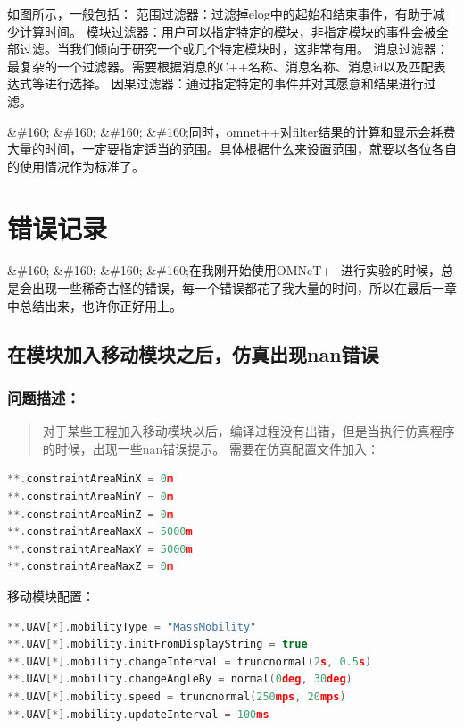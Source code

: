 如图所示，一般包括：
范围过滤器：过滤掉elog中的起始和结束事件，有助于减少计算时间。
模块过滤器：用户可以指定特定的模块，非指定模块的事件会被全部过滤。当我们倾向于研究一个或几个特定模块时，这非常有用。
消息过滤器：最复杂的一个过滤器。需要根据消息的C++名称、消息名称、消息id以及匹配表达式等进行选择。
因果过滤器：通过指定特定的事件并对其愿意和结果进行过滤。

\&\#160; \&\#160; \&\#160; \&\#160;同时，omnet++对filter结果的计算和显示会耗费大量的时间，一定要指定适当的范围。具体根据什么来设置范围，就要以各位各自的使用情况作为标准了。

\chapter{错误记录}
\label{错误记录}

\&\#160; \&\#160; \&\#160; \&\#160;在我刚开始使用OMNeT++进行实验的时候，总是会出现一些稀奇古怪的错误，每一个错误都花了我大量的时间，所以在最后一章中总结出来，也许你正好用上。

\section{在模块加入移动模块之后，仿真出现nan错误}
\label{在模块加入移动模块之后，仿真出现nan错误}

\subsection{问题描述：}
\label{问题描述：}

\begin{quote}
对于某些工程加入移动模块以后，编译过程没有出错，但是当执行仿真程序的时候，出现一些nan错误提示。
需要在仿真配置文件加入：
\end{quote}

\begin{lstlisting}[language=c]
**.constraintAreaMinX = 0m
**.constraintAreaMinY = 0m
**.constraintAreaMinZ = 0m
**.constraintAreaMaxX = 5000m
**.constraintAreaMaxY = 5000m
**.constraintAreaMaxZ = 0m

\end{lstlisting}

移动模块配置：

\begin{lstlisting}[language=c]
**.UAV[*].mobilityType = "MassMobility"
**.UAV[*].mobility.initFromDisplayString = true
**.UAV[*].mobility.changeInterval = truncnormal(2s, 0.5s)
**.UAV[*].mobility.changeAngleBy = normal(0deg, 30deg)
**.UAV[*].mobility.speed = truncnormal(250mps, 20mps)
**.UAV[*].mobility.updateInterval = 100ms

\end{lstlisting}

